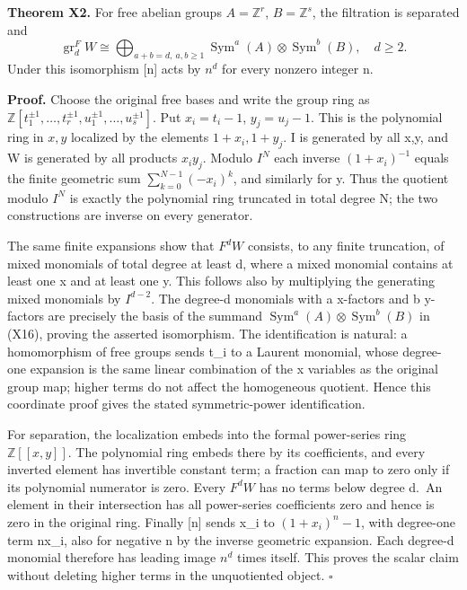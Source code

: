 \documentclass[
]{article}
\begin{document}
\textbf{Theorem X2.} For free abelian groups \(A=\mathbb Z^r\),
\(B=\mathbb Z^s\), the filtration is separated and \[
\operatorname{gr}_d^F W\cong
\bigoplus_{a+b=d,\ a,b\ge1}\operatorname{Sym}^a(A)\otimes\operatorname{Sym}^b(B),
\quad d\ge2.
\tag{X16}
\] Under this isomorphism {[}n{]} acts by \(n^d\) for every nonzero
integer n.

\textbf{Proof.} Choose the original free bases and write the group ring
as
\(\mathbb Z[t_1^{\pm1},\ldots,t_r^{\pm1},u_1^{\pm1},\ldots,u_s^{\pm1}]\).
Put \(x_i=t_i-1\), \(y_j=u_j-1\). This is the polynomial ring in \(x,y\)
localized by the elements \(1+x_i,1+y_j\). I is generated by all x,y,
and W is generated by all products \(x_i y_j\). Modulo \(I^N\) each
inverse \((1+x_i)^{-1}\) equals the finite geometric sum
\(\sum_{k=0}^{N-1}(-x_i)^k\), and similarly for y. Thus the quotient
modulo \(I^N\) is exactly the polynomial ring truncated in total degree
N; the two constructions are inverse on every generator.

The same finite expansions show that \(F^dW\) consists, to any finite
truncation, of mixed monomials of total degree at least d, where a mixed
monomial contains at least one x and at least one y. This follows also
by multiplying the generating mixed monomials by \(I^{d-2}\). The
degree-d monomials with a x-factors and b y-factors are precisely the
basis of the summand
\(\operatorname{Sym}^a(A)\otimes\operatorname{Sym}^b(B)\) in (X16),
proving the asserted isomorphism. The identification is natural: a
homomorphism of free groups sends t\_i to a Laurent monomial, whose
degree-one expansion is the same linear combination of the x variables
as the original group map; higher terms do not affect the homogeneous
quotient. Hence this coordinate proof gives the stated symmetric-power
identification.

For separation, the localization embeds into the formal power-series
ring \(\mathbb Z[[x,y]]\). The polynomial ring embeds there by its
coefficients, and every inverted element has invertible constant term; a
fraction can map to zero only if its polynomial numerator is zero. Every
\(F^dW\) has no terms below degree d.~An element in their intersection
has all power-series coefficients zero and hence is zero in the original
ring. Finally {[}n{]} sends x\_i to \((1+x_i)^n-1\), with degree-one
term nx\_i, also for negative n by the inverse geometric expansion. Each
degree-d monomial therefore has leading image \(n^d\) times itself. This
proves the scalar claim without deleting higher terms in the
unquotiented object. \(\square\)
\end{document}
